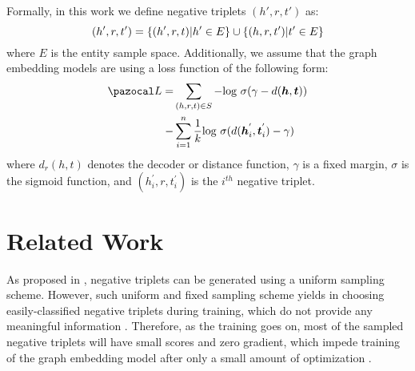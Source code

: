 
Formally, in this work we define negative triplets $(h',r,t')$ as:
\begin{equation}
    (h',r,t') = \{ (h',r,t)|h'\in E\} \cup \{(h,r,t')|t'\in E \}  \\
\end{equation}
where $E$ is the entity sample space. Additionally, we assume that the graph embedding models are using a loss function of the following form:
\begin{align}
    \Lb = &\sum_{(h,r,t) \in S} -\text{log }\sigma(\gamma - d(\boldsymbol{h},\boldsymbol{t}))  \notag \\ 
    - &\sum_{i=1}^{n} \frac{1}{k}\text{log }\sigma(d(\boldsymbol{h}_i^{'},\boldsymbol{t}_i^{'})-\gamma)
\end{align}
where $d_r(h,t)$ denotes the decoder or distance function, $\gamma$
is a fixed margin, $\sigma$ is the sigmoid function, and $(h_i^{'},r,t_i^{'})$ is the $i^{th}$ negative triplet.


\section{Related Work}
\label{sec:relatedwork}
As proposed in \cite{mikolov2013distributed}, negative triplets can be generated using a uniform sampling scheme. However, such uniform and fixed sampling scheme yields in choosing easily-classified negative triplets during training, which do not provide any meaningful information \cite{sun2019rotate, zhang2019nscaching}. Therefore, as the training goes on, most of the sampled negative triplets will have small scores and zero gradient, which impede training of the graph embedding model after only a small amount of optimization \cite{zhang2019nscaching, wang2018incorporating}. 

